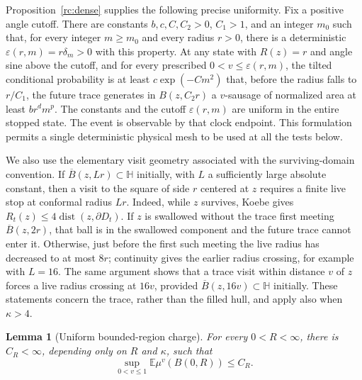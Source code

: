 \documentclass[11pt]{article}
\newtheorem{lemma}[theorem]{Lemma}
\theoremstyle{definition}
\theoremstyle{remark}
\numberwithin{equation}{section}
\begin{document}
Proposition~\ref{rc:dense} supplies the following precise uniformity.  Fix a
positive angle cutoff.  There are constants \(b,c,C,C_2>0\), \(C_1>1\),
and an integer \(m_0\) such that, for every integer \(m\ge m_0\)
and every radius \(r>0\), there is a deterministic
\(\varepsilon(r,m)=r\delta_m>0\) with this property.  At any state with
\(R(z)=r\) and angle sine above the cutoff, and for every prescribed
\(0<v\le\varepsilon(r,m)\), the tilted conditional probability is
at least \(c\exp(-Cm^2)\) that, before the radius falls to
\(r/C_1\), the future trace generates in \(B(z,C_2r)\) a
\(v\)-sausage of normalized area at least \(b r^d m^p\).
The constants and the cutoff \(\varepsilon(r,m)\) are uniform in
the entire stopped state.  The event is observable by that clock
endpoint.  This formulation permits a single deterministic physical
mesh to be used at all the tests below.

We also use the elementary visit geometry associated with the
surviving-domain convention.  If \(\overline B(z,Lr)\subset\mathbb H\)
initially, with \(L\) a sufficiently large absolute constant, then a
visit to the square of side \(r\) centered at \(z\) requires a finite
live stop at conformal radius \(Lr\).  Indeed, while \(z\) survives,
Koebe gives
\(R_t(z)\le4\operatorname{dist}(z,\partial D_t)\).
If \(z\) is swallowed without the trace first meeting
\(\overline B(z,2r)\), that ball is in the swallowed component and
the future trace cannot enter it.  Otherwise, just before the first
such meeting the live radius has decreased to at most \(8r\);
continuity gives the earlier radius crossing, for example with
\(L=16\).  The same argument shows that a trace visit within
distance \(v\) of \(z\) forces a live radius crossing at \(16v\),
provided \(\overline B(z,16v)\subset\mathbb H\) initially.
These statements concern the trace, rather
than the filled hull, and apply also when \(\kappa>4\).

\begin{lemma}[Uniform bounded-region charge]
\label{lem:cover-charge}
For every \(0<R<\infty\), there is \(C_R<\infty\), depending only on
\(R\) and \(\kappa\), such that
\[
 \sup_{0<v\le1}\mathbb E\mu^v(B(0,R))\le C_R.
\]
\end{lemma}
\end{document}
